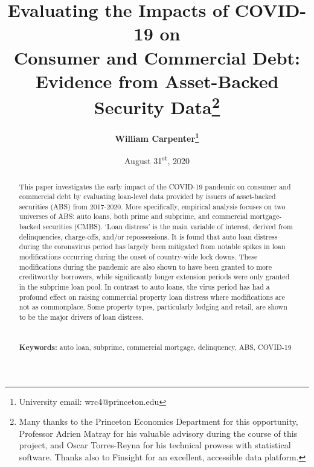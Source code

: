 \documentclass[10.5pt]{article}
\begin{document}
\title{Evaluating the Impacts of COVID-19 on \\ Consumer and Commercial Debt: \\ Evidence from Asset-Backed Security Data\footnote{Many thanks to the Princeton Economics Department for this opportunity, Professor Adrien Matray for his valuable advisory during the course of this project, and Oscar Torres-Reyna for his technical prowess with statistical software. Thanks also to Finsight for an excellent, accessible data platform. }}
\author{\textbf{William Carpenter\footnote{University email: wrc4@princeton.edu}}}
\date{August 31\textsuperscript{st}, 2020}
\maketitle 
\vspace{2.5em}
\hline\hline 
\begin{abstract}
   This paper investigates the early impact of the COVID-19 pandemic on consumer and commercial debt by evaluating loan-level data provided by issuers of asset-backed securities (ABS) from 2017-2020. More specifically, empirical analysis focuses on two universes of ABS: auto loans, both prime and subprime, and commercial mortgage-backed securities (CMBS). `Loan distress' is the main variable of interest, derived from delinquencies, charge-offs, and/or repossessions. It is found that auto loan distress during the coronavirus period has largely been mitigated from notable spikes in loan modifications occurring during the onset of country-wide lock downs. These modifications during the pandemic are also shown to have been granted to more creditworthy borrowers, while significantly longer extension periods were only granted in the subprime loan pool. In contrast to auto loans, the virus period has had a profound effect on raising commercial property loan distress where modifications are not as commonplace. Some property types, particularly lodging and retail, are shown to be the major drivers of loan distress.  \\ \\
    \\
      \normalsize{\textbf{Keywords:} auto loan, subprime, commercial mortgage, delinquency, ABS, COVID-19} \\ 
\end{abstract}
\hline\hline
\vspace{3.5em}
\thispagestyle{empty}
\newpage
\end{document}
